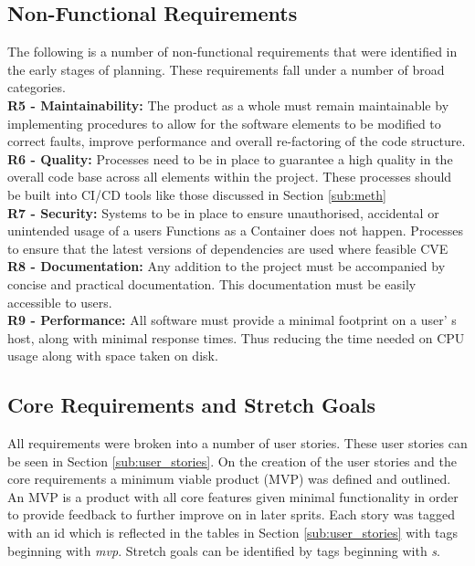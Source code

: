 \subsection{Non-Functional Requirements}
The following is a number of non-functional requirements that were identified in the early stages of planning. These requirements fall under a number of broad categories.
\newline
\\\textbf{R5 - Maintainability:}\label{req:r10} The product as a whole must remain maintainable by implementing procedures to allow for the software elements to be modified to correct faults, improve performance and overall re-factoring of the code structure. 
\newline
\\\textbf{R6 - Quality:}\label{req:r11} Processes need to be in place to guarantee a high quality in the overall code base across all elements within the project. These processes should be built into CI/CD tools like those discussed in Section \ref{sub:meth}
\newline
\\\textbf{R7 - Security:}\label{req:r12} Systems to be in place to ensure unauthorised, accidental or unintended usage of a users Functions as a Container does not happen. Processes to ensure that the latest versions of dependencies are used where feasible \gls{CVE}
\newline
\\\textbf{R8 - Documentation:}\label{req:r13} Any addition to the project must be accompanied by concise and practical documentation. This documentation must be easily accessible to users.
\newline
\\\textbf{R9 - Performance:}\label{req:r14} All software must provide a minimal footprint on a user'
s host, along with minimal response times. Thus reducing the time needed on CPU usage along with space taken on disk.
\newline

\subsection{Core Requirements and Stretch Goals}
All requirements were broken into a number of user stories. These user stories can be seen in Section \ref{sub:user_stories}. On the creation of the user stories and the core requirements a minimum viable product (MVP) was defined and outlined. An MVP is a product with all core features given minimal functionality in order to provide feedback to further improve on in later sprits. Each story was tagged with an id which is reflected in the tables in Section \ref{sub:user_stories} with tags beginning with \textit{mvp}. Stretch goals can be identified by tags beginning with \textit{s}.
\newpage
